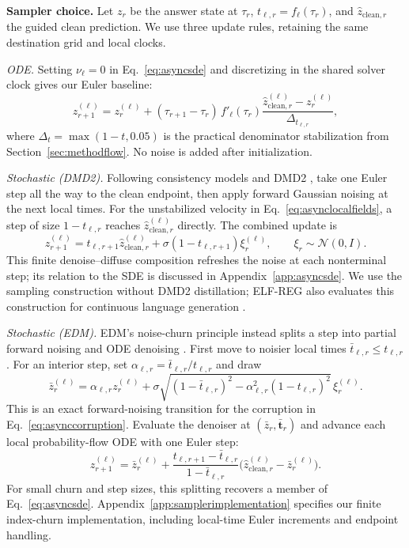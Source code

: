 \documentclass[11pt,letterpaper]{article}
\begin{document}
\textbf{Sampler choice.}
Let $z_r$ be the answer state at $\tau_r$, $t_{\ell,r}=f_\ell(\tau_r)$, and $\widehat z_{\mathrm{clean},r}$ the guided clean prediction. We use three update rules, retaining the same destination grid and local clocks.

\emph{ODE.} Setting $\nu_\ell=0$ in Eq.~\eqref{eq:asyncsde} and discretizing in the shared solver clock gives our Euler baseline:
\begin{equation}
 z_{r+1}^{(\ell)}=z_r^{(\ell)}+
 (\tau_{r+1}-\tau_r)\,f'_\ell(\tau_r)
 \frac{\widehat z_{\mathrm{clean},r}^{(\ell)}-z_r^{(\ell)}}
 {\Delta_{t_{\ell,r}}},
 \label{eq:asyncsampler}
\end{equation}
where $\Delta_t=\max(1-t,0.05)$ is the practical denominator stabilization from Section~\ref{sec:methodflow}. No noise is added after initialization.

\emph{Stochastic (DMD2).} Following consistency models and DMD2 \citep{consistencymodels,dmd2}, take one Euler step all the way to the clean endpoint, then apply forward Gaussian noising at the next local times. For the unstabilized velocity in Eq.~\eqref{eq:asynclocalfields}, a step of size $1-t_{\ell,r}$ reaches $\widehat z_{\mathrm{clean},r}^{(\ell)}$ directly. The combined update is
\begin{equation}
 z_{r+1}^{(\ell)}
 =t_{\ell,r+1}\widehat z_{\mathrm{clean},r}^{(\ell)}
 +\sigma(1-t_{\ell,r+1})\xi_r^{(\ell)},
 \qquad \xi_r\sim\mathcal N(0,I).
 \label{eq:asyncdmd2}
\end{equation}
This finite denoise--diffuse composition refreshes the noise at each nonterminal step; its relation to the SDE is discussed in Appendix~\ref{app:asyncsde}. We use the sampling construction without DMD2 distillation; ELF-REG also evaluates this construction for continuous language generation \citep{scalingdlm}.

\emph{Stochastic (EDM).} EDM's noise-churn principle instead splits a step into partial forward noising and ODE denoising \citep{edm}. First move to noisier local times $\bar t_{\ell,r}\leq t_{\ell,r}$. For an interior step, set $\alpha_{\ell,r}=\bar t_{\ell,r}/t_{\ell,r}$ and draw
\begin{equation}
 \bar z_r^{(\ell)}
 =\alpha_{\ell,r}z_r^{(\ell)}
 +\sigma\sqrt{(1-\bar t_{\ell,r})^2
 -\alpha_{\ell,r}^2(1-t_{\ell,r})^2}\,\xi_r^{(\ell)}.
 \label{eq:asyncchurnback}
\end{equation}
This is an exact forward-noising transition for the corruption in Eq.~\eqref{eq:asynccorruption}. Evaluate the denoiser at $(\bar z_r,\bar{\bm t}_r)$ and advance each local probability-flow ODE with one Euler step:
\begin{equation}
 z_{r+1}^{(\ell)}
 =\bar z_r^{(\ell)}
 +\frac{t_{\ell,r+1}-\bar t_{\ell,r}}{1-\bar t_{\ell,r}}
 \bigl(\widehat z_{\mathrm{clean},r}^{(\ell)}-\bar z_r^{(\ell)}\bigr).
 \label{eq:asyncchurnforward}
\end{equation}
For small churn and step sizes, this splitting recovers a member of Eq.~\eqref{eq:asyncsde}. Appendix~\ref{app:samplerimplementation} specifies our finite index-churn implementation, including local-time Euler increments and endpoint handling.
\end{document}
